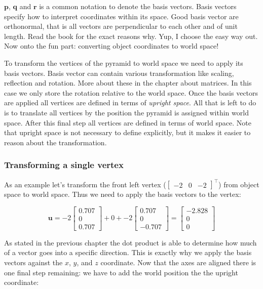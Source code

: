 \documentclass[a4paper,11pt]{article}
\begin{document}
$\textbf{p}$, $\textbf{q}$ and $\textbf{r}$ is a common notation to denote the basis vectors. Basis vectors specify how to interpret coordinates within its space. Good basis vector are orthonormal, that is all vectors are perpendicular to each other and of unit length. Read the book for the exact reasons why. Yup, I choose the easy way out. Now onto the fun part: converting object coordinates to world space!

To transform the vertices of the pyramid to world space we need to apply its basis vectors. Basis vector can contain various transformation like scaling, reflection and rotation. More about these in the chapter about matrices. In this case we only store the rotation relative to the world space. Once the basis vectors are applied all vertices are defined in terms of \textit{upright space}. All that is left to do is to translate all vertices by the position the pyramid is assigned within world space. After this final step all vertices are defined in terms of world space. Note that upright space is not necessary to define explicitly, but it makes it easier to reason about the transformation.

\subsubsection{Transforming a single vertex}

As an example let's transform the front left vertex ($\begin{bmatrix}
		-2 & 0 & -2
	\end{bmatrix}^\intercal$) from object space to world space. Thus we need to apply the basis vectors to the vertex:

$$\textbf{u}=-2\begin{bmatrix}0.707 \\ 0 \\ 0.707\end{bmatrix}+0+-2\begin{bmatrix}0.707 \\ 0 \\ -0.707\end{bmatrix}=\begin{bmatrix}-2.828 \\ 0 \\ 0\end{bmatrix}$$

As stated in the previous chapter the dot product is able to determine how much of a vector goes into a specific direction. This is exactly why we apply the basis vectors against the $x$, $y$, and $z$ coordinate. Now that the axes are aligned there is one final step remaining: we have to add the world position the the upright coordinate:
\end{document}
